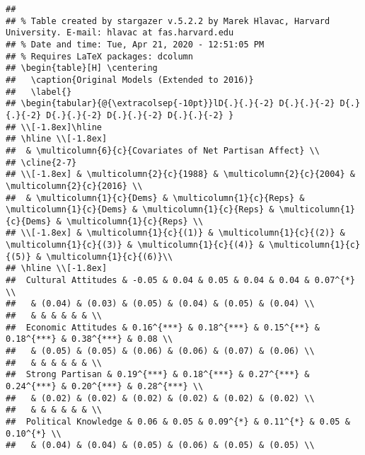 \documentclass[
]{article}
\begin{document}
\begin{verbatim}
## 
## % Table created by stargazer v.5.2.2 by Marek Hlavac, Harvard University. E-mail: hlavac at fas.harvard.edu
## % Date and time: Tue, Apr 21, 2020 - 12:51:05 PM
## % Requires LaTeX packages: dcolumn 
## \begin{table}[H] \centering 
##   \caption{Original Models (Extended to 2016)} 
##   \label{} 
## \begin{tabular}{@{\extracolsep{-10pt}}lD{.}{.}{-2} D{.}{.}{-2} D{.}{.}{-2} D{.}{.}{-2} D{.}{.}{-2} D{.}{.}{-2} } 
## \\[-1.8ex]\hline 
## \hline \\[-1.8ex] 
##  & \multicolumn{6}{c}{Covariates of Net Partisan Affect} \\ 
## \cline{2-7} 
## \\[-1.8ex] & \multicolumn{2}{c}{1988} & \multicolumn{2}{c}{2004} & \multicolumn{2}{c}{2016} \\ 
##  & \multicolumn{1}{c}{Dems} & \multicolumn{1}{c}{Reps} & \multicolumn{1}{c}{Dems} & \multicolumn{1}{c}{Reps} & \multicolumn{1}{c}{Dems} & \multicolumn{1}{c}{Reps} \\ 
## \\[-1.8ex] & \multicolumn{1}{c}{(1)} & \multicolumn{1}{c}{(2)} & \multicolumn{1}{c}{(3)} & \multicolumn{1}{c}{(4)} & \multicolumn{1}{c}{(5)} & \multicolumn{1}{c}{(6)}\\ 
## \hline \\[-1.8ex] 
##  Cultural Attitudes & -0.05 & 0.04 & 0.05 & 0.04 & 0.04 & 0.07^{*} \\ 
##   & (0.04) & (0.03) & (0.05) & (0.04) & (0.05) & (0.04) \\ 
##   & & & & & & \\ 
##  Economic Attitudes & 0.16^{***} & 0.18^{***} & 0.15^{**} & 0.18^{***} & 0.38^{***} & 0.08 \\ 
##   & (0.05) & (0.05) & (0.06) & (0.06) & (0.07) & (0.06) \\ 
##   & & & & & & \\ 
##  Strong Partisan & 0.19^{***} & 0.18^{***} & 0.27^{***} & 0.24^{***} & 0.20^{***} & 0.28^{***} \\ 
##   & (0.02) & (0.02) & (0.02) & (0.02) & (0.02) & (0.02) \\ 
##   & & & & & & \\ 
##  Political Knowledge & 0.06 & 0.05 & 0.09^{*} & 0.11^{*} & 0.05 & 0.10^{*} \\ 
##   & (0.04) & (0.04) & (0.05) & (0.06) & (0.05) & (0.05) \\ 

\end{verbatim}
\end{document}
